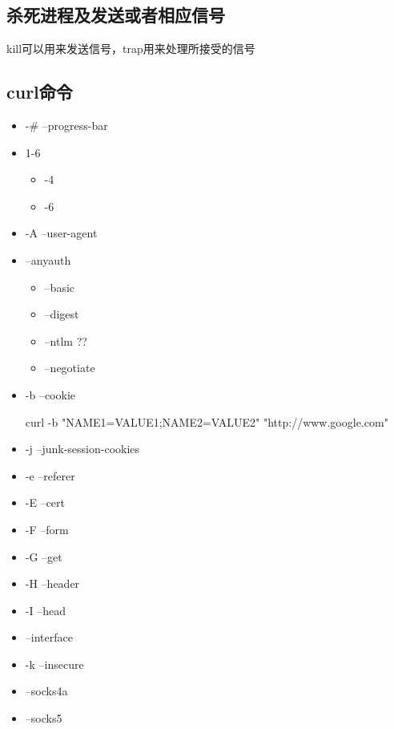 \subsection{杀死进程及发送或者相应信号}

kill可以用来发送信号，trap用来处理所接受的信号


\subsection{curl命令}


\begin{itemize}
\item -\# --progress-bar
\item 1-6
	\begin{itemize}
	\item -4
	\item -6
	\end{itemize}
\item -A --user-agent
\item --anyauth
	\begin{itemize}
	\item --basic
	\item --digest
	\item --ntlm ??
	\item --negotiate
	\end{itemize}	
\item -b --cookie
\begin{Bash}
curl -b "NAME1=VALUE1;NAME2=VALUE2" "http://www.google.com"
\end{Bash}	
\item -j --junk-session-cookies

\item -e --referer
\item -E --cert
\item -F --form

\item -G --get
\item -H --header

\item -I --head

\item --interface

\item -k --insecure

\item --socks4a
\item --socks5


\end{itemize}
